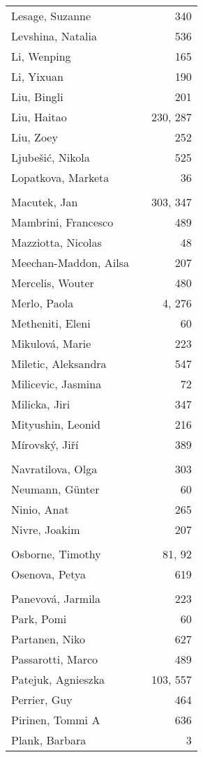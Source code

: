 \documentclass{easychair}
\begin{document}
\begin{longtable}{lp{10em}r}
Lesage, Suzanne & & 340 
\\
Levshina, Natalia & & 536 
\\
Li, Wenping & & 165 
\\
Li, Yixuan & & 190 
\\
Liu, Bingli & & 201 
\\
Liu, Haitao & & 230, 287 
\\
Liu, Zoey & & 252 
\\
Ljube\v{s}i\'c, Nikola & & 525 
\\
Lopatkova, Marketa & & 36 
\\
\\
Macutek, Jan & & 303, 347 
\\
Mambrini, Francesco & & 489 
\\
Mazziotta, Nicolas & & 48 
\\
Meechan-Maddon, Ailsa & & 207 
\\
Mercelis, Wouter & & 480 
\\
Merlo, Paola & & 4, 276 
\\
Metheniti, Eleni & & 60 
\\
Mikulov\'a, Marie & & 223 
\\
Miletic, Aleksandra & & 547 
\\
Milicevic, Jasmina & & 72 
\\
Milicka, Jiri & & 347 
\\
Mityushin, Leonid & & 216 
\\
M\'irovsk\'y, Ji\v{r}\'i & & 389 
\\
\\
Navratilova, Olga & & 303 
\\
Neumann, G\"unter & & 60 
\\
Ninio, Anat & & 265 
\\
Nivre, Joakim & & 207 
\\
\\
Osborne, Timothy & & 81, 92 
\\
Osenova, Petya & & 619 
\\
\\
Panevov\'a, Jarmila & & 223 
\\
Park, Pomi & & 60 
\\
Partanen, Niko & & 627 
\\
Passarotti, Marco & & 489 
\\
Patejuk, Agnieszka & & 103, 557 
\\
Perrier, Guy & & 464 
\\
Pirinen, Tommi A & & 636 
\\
Plank, Barbara & & 3 

\end{longtable}
\end{document}

